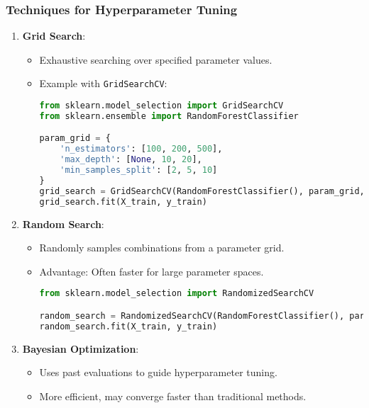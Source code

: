\documentclass[aspectratio=169]{beamer}
\begin{document}
\begin{frame}[fragile]
    \frametitle{Techniques for Hyperparameter Tuning}
    \begin{enumerate}
        \item \textbf{Grid Search}:
            \begin{itemize}
                \item Exhaustive searching over specified parameter values.
                \item Example with \texttt{GridSearchCV}:
                \begin{lstlisting}[language=Python]
from sklearn.model_selection import GridSearchCV
from sklearn.ensemble import RandomForestClassifier

param_grid = {
    'n_estimators': [100, 200, 500],
    'max_depth': [None, 10, 20],
    'min_samples_split': [2, 5, 10]
}
grid_search = GridSearchCV(RandomForestClassifier(), param_grid, cv=5)
grid_search.fit(X_train, y_train)
                \end{lstlisting}
            \end{itemize}

        \item \textbf{Random Search}:
            \begin{itemize}
                \item Randomly samples combinations from a parameter grid.
                \item Advantage: Often faster for large parameter spaces.
                \begin{lstlisting}[language=Python]
from sklearn.model_selection import RandomizedSearchCV

random_search = RandomizedSearchCV(RandomForestClassifier(), param_distributions=param_grid, n_iter=10, cv=5)
random_search.fit(X_train, y_train)
                \end{lstlisting}
            \end{itemize}

        \item \textbf{Bayesian Optimization}:
            \begin{itemize}
                \item Uses past evaluations to guide hyperparameter tuning.
                \item More efficient, may converge faster than traditional methods.
            \end{itemize}
    \end{enumerate}
\end{frame}
\end{document}
